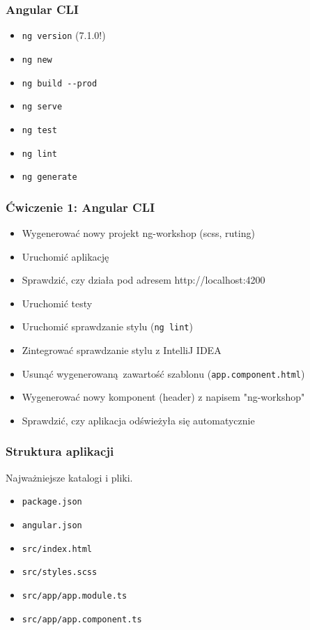 \documentclass{beamer}
\begin{document}
\begin{frame}
    \frametitle{Angular CLI}
    \begin{itemize}
        \item \lstinline{ng version} (7.1.0!)
        \item \lstinline{ng new}
        \item \lstinline{ng build --prod}
        \item \lstinline{ng serve}
        \item \lstinline{ng test}
        \item \lstinline{ng lint}
        \item \lstinline{ng generate}
    \end{itemize}
\end{frame}

\begin{frame}
    \frametitle{Ćwiczenie 1: Angular CLI}
    \begin{itemize}
        \item Wygenerować nowy projekt ng-workshop (scss, ruting)
        \item Uruchomić aplikację
        \item Sprawdzić, czy działa pod adresem http://localhost:4200
        \item Uruchomić testy
        \item Uruchomić sprawdzanie stylu (\lstinline{ng lint})
        \item Zintegrować sprawdzanie stylu z IntelliJ IDEA
        \item Usunąć wygenerowaną zawartość szablonu (\lstinline{app.component.html})
        \item Wygenerować nowy komponent (header) z napisem "ng-workshop"
        \item Sprawdzić, czy aplikacja odświeżyła się automatycznie
    \end{itemize}
\end{frame}

\begin{frame}
    \frametitle{Struktura aplikacji}
    Najważniejsze katalogi i pliki.
    \begin{itemize}
        \item \lstinline{package.json}
        \item \lstinline{angular.json}
        \item \lstinline{src/index.html}
        \item \lstinline{src/styles.scss}
        \item \lstinline{src/app/app.module.ts}
        \item \lstinline{src/app/app.component.ts}
    \end{itemize}
\end{frame}
\end{document}
